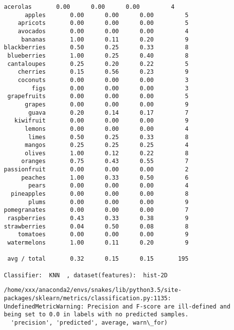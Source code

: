 \documentclass[11pt]{article}
\begin{document}
\begin{Verbatim}[commandchars=\\\{\}]
    acerolas       0.00      0.00      0.00         4
      apples       0.00      0.00      0.00         5
    apricots       0.00      0.00      0.00         5
    avocados       0.00      0.00      0.00         4
     bananas       1.00      0.11      0.20         9
blackberries       0.50      0.25      0.33         8
 blueberries       1.00      0.25      0.40         8
 cantaloupes       0.25      0.20      0.22         5
    cherries       0.15      0.56      0.23         9
    coconuts       0.00      0.00      0.00         3
        figs       0.00      0.00      0.00         3
 grapefruits       0.00      0.00      0.00         5
      grapes       0.00      0.00      0.00         9
       guava       0.20      0.14      0.17         7
   kiwifruit       0.00      0.00      0.00         9
      lemons       0.00      0.00      0.00         4
       limes       0.50      0.25      0.33         8
      mangos       0.25      0.25      0.25         4
      olives       1.00      0.12      0.22         8
     oranges       0.75      0.43      0.55         7
passionfruit       0.00      0.00      0.00         2
     peaches       1.00      0.33      0.50         6
       pears       0.00      0.00      0.00         4
  pineapples       0.00      0.00      0.00         8
       plums       0.00      0.00      0.00         9
pomegranates       0.00      0.00      0.00         7
 raspberries       0.43      0.33      0.38         9
strawberries       0.04      0.50      0.08         8
    tomatoes       0.00      0.00      0.00         9
 watermelons       1.00      0.11      0.20         9

 avg / total       0.32      0.15      0.15       195

Classifier:  KNN  , dataset(features):  hist-2D

    \end{Verbatim}

    \begin{Verbatim}[commandchars=\\\{\}]
/home/xxx/anaconda2/envs/snakes/lib/python3.5/site-packages/sklearn/metrics/classification.py:1135: UndefinedMetricWarning: Precision and F-score are ill-defined and being set to 0.0 in labels with no predicted samples.
  'precision', 'predicted', average, warn\_for)

    \end{Verbatim}
\end{document}
